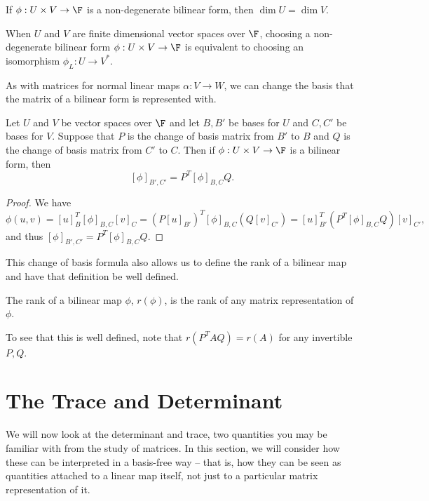 \begin{corollary}
    If $\phi: U \times V \rightarrow \F$ is a non-degenerate bilinear form, then $\dim U = \dim V$.
\end{corollary}

\begin{corollary}
    When $U$ and $V$ are finite dimensional vector spaces over $\F$, choosing a non-degenerate bilinear form $\phi: U \times V \rightarrow \F$ is equivalent to choosing an isomorphism $\phi_L : U \rightarrow V^*$.
\end{corollary}

As with matrices for normal linear maps $\alpha: V \rightarrow W$, we can change the basis that the matrix of a bilinear form is represented with.

\begin{proposition}
    Let $U$ and $V$ be vector spaces over $\F$ and let $B, B'$ be bases for $U$ and $C, C'$ be bases for $V$. Suppose that $P$ is the change of basis matrix from $B'$ to $B$ and $Q$ is the change of basis matrix from $C'$ to $C$. Then if $\phi: U \times V \rightarrow \F$ is a bilinear form, then
    $$
    [\phi]_{B', C'} = P^T [\phi]_{B, C} Q.
    $$
\end{proposition}
\begin{proof}
    We have
    $$
        \phi(u, v) = [u]^T_B [\phi]_{B, C} [v]_C 
            = (P[u]_{B'})^T [\phi]_{B, C} (Q [v]_{C'}) 
                = [u]^T_{B'} (P^T [\phi]_{B, C} Q) [v]_{C'},
    $$
    and thus $[\phi]_{B', C'} = P^T [\phi]_{B, C} Q$.
\end{proof}

This change of basis formula also allows us to define the rank of a bilinear map and have that definition be well defined.

\begin{definition}
    The rank of a bilinear map $\phi$, $r(\phi)$, is the rank of any matrix representation of $\phi$. 
\end{definition}

To see that this is well defined, note that $r(P^T AQ) = r(A)$ for any invertible $P, Q$.

\section{The Trace and Determinant}

We will now look at the determinant and trace, two quantities you may be familiar with from the study of matrices. In this section, we will consider how these can be interpreted in a basis-free way -- that is, how they can be seen as quantities attached to a linear map itself, not just to a particular matrix representation of it.


